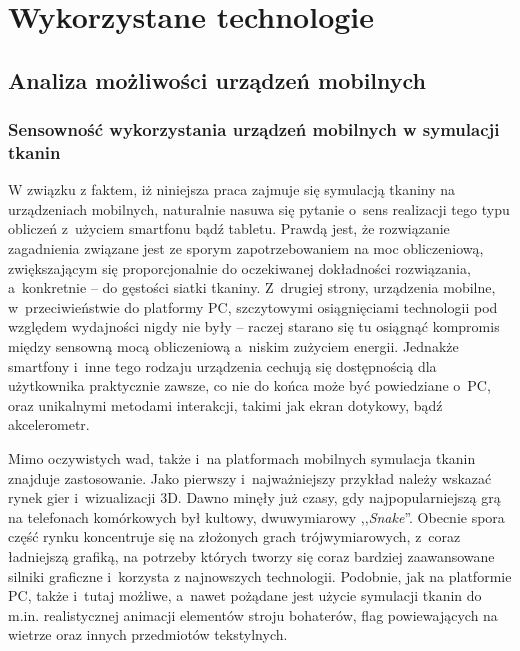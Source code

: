 \chapter{Wykorzystane technologie}
\label{t:technologie}


	\section{Analiza możliwości urządzeń mobilnych}
	\label{t:technologie:mobilne}
	
		\subsection{Sensowność wykorzystania urządzeń mobilnych w symulacji tkanin}
		\label{t:technologie:mobilne:dlaczego}
		
		
		W związku z faktem, iż niniejsza praca zajmuje się symulacją tkaniny na urządzeniach mobilnych, naturalnie nasuwa się pytanie o~sens realizacji tego typu obliczeń z~użyciem smartfonu bądź tabletu. Prawdą jest, że rozwiązanie zagadnienia związane jest ze sporym zapotrzebowaniem na moc obliczeniową, zwiększającym się proporcjonalnie do oczekiwanej dokładności rozwiązania, a~konkretnie -- do gęstości siatki tkaniny. Z~drugiej strony, urządzenia mobilne, w~przeciwieństwie do platformy PC, szczytowymi osiągnięciami technologii pod względem wydajności nigdy nie były -- raczej starano się tu osiągnąć kompromis między sensowną mocą obliczeniową a~niskim zużyciem energii. Jednakże smartfony i~inne tego rodzaju urządzenia cechują się dostępnością dla użytkownika praktycznie zawsze, co nie do końca może być powiedziane o~PC, oraz unikalnymi metodami interakcji, takimi jak ekran dotykowy, bądź akcelerometr.
		
		Mimo oczywistych wad, także i~na platformach mobilnych symulacja tkanin znajduje zastosowanie. Jako pierwszy i~najważniejszy przykład należy wskazać rynek gier i~wizualizacji 3D. Dawno minęły już czasy, gdy najpopularniejszą grą na telefonach komórkowych był kultowy, dwuwymiarowy ,,\emph{Snake}''. Obecnie spora część rynku koncentruje się na złożonych grach trójwymiarowych, z~coraz ładniejszą grafiką, na potrzeby których tworzy się coraz bardziej zaawansowane silniki graficzne i~korzysta z najnowszych technologii. Podobnie, jak na platformie PC, także i~tutaj możliwe, a~nawet pożądane jest użycie symulacji tkanin do m.in. realistycznej animacji elementów stroju bohaterów, flag powiewających na wietrze oraz innych przedmiotów tekstylnych.
		
